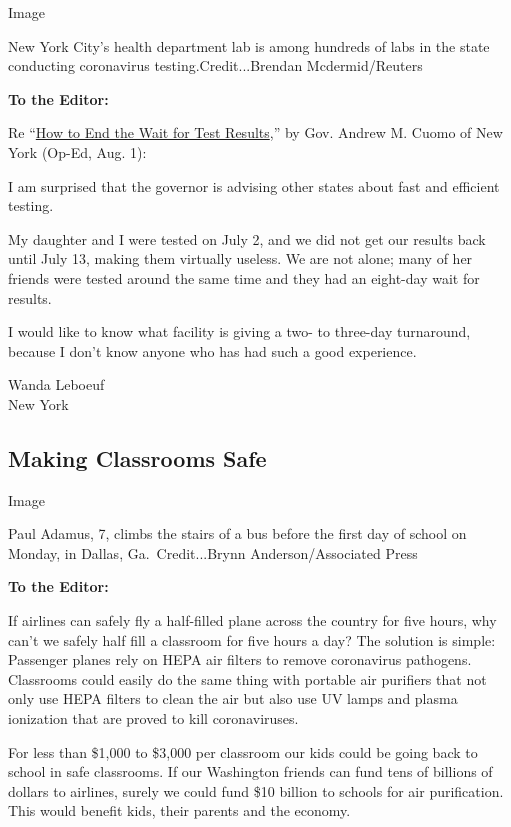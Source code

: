 Image

New York City's health department lab is among hundreds of labs in the
state conducting coronavirus testing.Credit...Brendan Mcdermid/Reuters

\textbf{To the Editor:}

Re
``\href{https://www.nytimes3xbfgragh.onion/2020/07/31/opinion/coronavirus-testing-cuomo.html}{How
to End the Wait for Test Results},'' by Gov. Andrew M. Cuomo of New York
(Op-Ed, Aug. 1):

I am surprised that the governor is advising other states about fast and
efficient testing.

My daughter and I were tested on July 2, and we did not get our results
back until July 13, making them virtually useless. We are not alone;
many of her friends were tested around the same time and they had an
eight-day wait for results.

I would like to know what facility is giving a two- to three-day
turnaround, because I don't know anyone who has had such a good
experience.

Wanda Leboeuf\\
New York

\hypertarget{making-classrooms-safe}{%
\subsection{Making Classrooms Safe}\label{making-classrooms-safe}}

Image

Paul Adamus, 7, climbs the stairs of a bus before the first day of
school on Monday, in Dallas, Ga.~Credit...Brynn Anderson/Associated
Press

\textbf{To the Editor:}

If airlines can safely fly a half-filled plane across the country for
five hours, why can't we safely half fill a classroom for five hours a
day? The solution is simple: Passenger planes rely on HEPA air filters
to remove coronavirus pathogens. Classrooms could easily do the same
thing with portable air purifiers that not only use HEPA filters to
clean the air but also use UV lamps and plasma ionization that are
proved to kill coronaviruses.

For less than \$1,000 to \$3,000 per classroom our kids could be going
back to school in safe classrooms. If our Washington friends can fund
tens of billions of dollars to airlines, surely we could fund \$10
billion to schools for air purification. This would benefit kids, their
parents and the economy.

